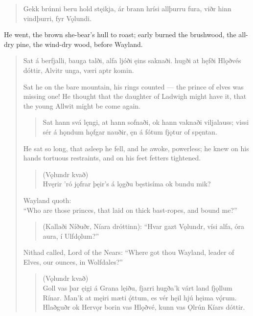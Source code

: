 \begin{verse}
\bva Gekk brúnni \hld beru hold stęikja,
ár brann hrísi \hld allþurru fura,
viðr hinn vindþurri, \hld fyr Vǫlundi. \\%
\end{verse}

\bvb He went, the brown she-bear’s hull to roast; early burned the brushwood, the all-dry pine, the wind-dry wood, before Wayland.

\begin{verse}
\bva Sat á berfjalli, \hld bauga talði,
alfa ljóði \hld ęins saknaði.
hugði at hęfði \hld Hlǫðvés dóttir,
Alvitr unga, \hld væri aptr komin.
 
\bvb Sat he on the bare mountain, his rings counted — the prince of elves was missing one! He thought that the daughter of Ladwigh might have it, that the young Allwit might be come again.

\begin{verse}
\bva Sat hann svá lęngi, \hld at hann sofnaði,
ok hann vaknaði \hld viljalauss;
vissi sér á hǫndum \hld hǫfgar nauðir,
ęn á fótum \hld fjǫtur of spęntan. \\%
\end{verse}

\bvb He sat so long, that asleep he fell, and he awoke, powerless; he knew on his hands tortuous restraints, and on his feet fetters tightened.

\begin{verse}
(Vǫlundr kvað) \\
\bva Hvęrir ’ró jǫfrar \hld þęir’s á lǫgðu
bęstisíma \hld ok bundu mik? \\%
\end{verse}

\bvb Wayland quoth: \\
“Who are those princes, that laid on thick bast-ropes, and bound me?”

\begin{verse}
\bva (Kallaði Níðuðr, \hld Níara dróttinn):
“Hvar gazt Vǫlundr, \hld vísi alfa,
óra aura, \hld í Ulfdǫlum?” \\%

\end{verse}

\bvb Nithad called, Lord of the Nears: “Where got thou Wayland, leader of Elves, our ounces\footnotemark[1], in Wolfdales?”

\begin{verse}
(Vǫlundr kvað) \\
\bva Goll vas þar ęigi \hld á Grana lęiðu,
fjarri hugða’k várt land \hld fjǫllum Rínar.
Man’k at męiri \hld mæti ǫ́ttum,
es vér hęil hjú \hld hęima vǫ́rum. \\%
Hlaðguðr ok Hervǫr \hld borin vas Hlǫðvé,
kunn vas Ǫlrún \hld Kíars dóttir.  \\%
\end{verse}


\end{verse}
